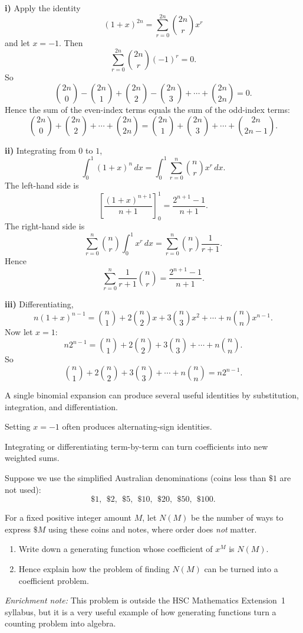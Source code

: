 \begin{solution}
\textbf{i)} Apply the identity
\[
(1+x)^{2n}=\sum_{r=0}^{2n} \binom{2n}{r}x^r
\]
and let $x=-1$. Then
\[
\sum_{r=0}^{2n}\binom{2n}{r}(-1)^r=0.
\]
So
\[
\binom{2n}{0}-\binom{2n}{1}+\binom{2n}{2}-\binom{2n}{3}+\cdots+\binom{2n}{2n}=0.
\]
Hence the sum of the even-index terms equals the sum of the odd-index terms:
\[
\boxed{
\binom{2n}{0}+\binom{2n}{2}+\cdots+\binom{2n}{2n}
=
\binom{2n}{1}+\binom{2n}{3}+\cdots+\binom{2n}{2n-1}.
}
\]

\textbf{ii)} Integrating from $0$ to $1$,
\[
\int_0^1 (1+x)^n\,dx=\int_0^1 \sum_{r=0}^n \binom{n}{r}x^r\,dx.
\]
The left-hand side is
\[
\left[\frac{(1+x)^{n+1}}{n+1}\right]_0^1=\frac{2^{n+1}-1}{n+1}.
\]
The right-hand side is
\[
\sum_{r=0}^n \binom{n}{r}\int_0^1 x^r\,dx
=\sum_{r=0}^n \binom{n}{r}\frac{1}{r+1}.
\]
Hence
\[
\boxed{\sum_{r=0}^n \frac{1}{r+1}\binom{n}{r}=\frac{2^{n+1}-1}{n+1}.}
\]

\textbf{iii)} Differentiating,
\[
n(1+x)^{n-1}=\binom{n}{1}+2\binom{n}{2}x+3\binom{n}{3}x^2+\cdots+n\binom{n}{n}x^{n-1}.
\]
Now let $x=1$:
\[
n2^{n-1}=\binom{n}{1}+2\binom{n}{2}+3\binom{n}{3}+\cdots+n\binom{n}{n}.
\]
So
\[
\boxed{\binom{n}{1}+2\binom{n}{2}+3\binom{n}{3}+\cdots+n\binom{n}{n}=n2^{n-1}.}
\]
\end{solution}

\begin{takeaways}
\item A single binomial expansion can produce several useful identities by substitution, integration, and differentiation.
\item Setting $x=-1$ often produces alternating-sign identities.
\item Integrating or differentiating term-by-term can turn coefficients into new weighted sums.
\end{takeaways}

\begin{problem}
Suppose we use the simplified Australian denominations (coins less than $\$1$ are not used): 
\[
\$1,\ \ \$2,\ \ \$5,\ \ \$10,\ \ \$20,\ \ \$50,\ \ \$100.
\]

For a fixed positive integer amount $M$, let $N(M)$ be the number of ways to express $\$M$ using these coins and notes, where order does \emph{not} matter.

\begin{enumerate}[label=\roman*)]
\item Write down a generating function whose coefficient of $x^M$ is $N(M)$.
\item Hence explain how the problem of finding $N(M)$ can be turned into a coefficient problem.
\end{enumerate}

\smallskip
\noindent\textit{Enrichment note:} This problem is outside the HSC Mathematics Extension~1 syllabus, but it is a very useful example of how generating functions turn a counting problem into algebra.
\end{problem}

